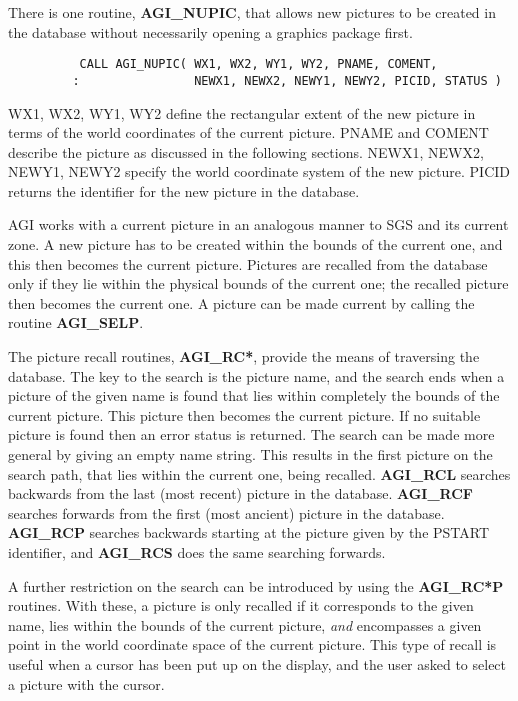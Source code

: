 There is one routine, {\bf AGI\_NUPIC}, that allows new pictures to be created
in the database without necessarily opening a graphics package first.
\begin{verbatim}
          CALL AGI_NUPIC( WX1, WX2, WY1, WY2, PNAME, COMENT,
         :                NEWX1, NEWX2, NEWY1, NEWY2, PICID, STATUS )
\end{verbatim}
WX1, WX2, WY1, WY2 define the rectangular extent of the new picture in terms of
the world coordinates of the current picture.
PNAME and COMENT describe the picture as discussed in the following
sections.
NEWX1, NEWX2, NEWY1, NEWY2 specify the world coordinate system of the new
picture.
PICID returns the identifier for the new picture in the database.

AGI works with a current picture in an analogous manner to SGS and its
current zone.
A new picture has to be created within the bounds of the current one, and this
then becomes the current picture.
Pictures are recalled from the database only if they lie within the physical
bounds of the current one; the recalled picture then becomes the current one.
A picture can be made current by calling the routine {\bf AGI\_SELP}.

The picture recall routines, {\bf AGI\_RC*}, provide the means of traversing
the database.
The key to the search is the picture name, and the search ends when a picture
of the given name is found that lies within completely the bounds of the
current picture. This picture then becomes the current picture.
If no suitable picture is found then an error status is returned.
The search can be made more general by giving an empty name string. This
results in the first picture on the search path, that lies within the current
one, being recalled.
{\bf AGI\_RCL} searches backwards from the last (most recent) picture in the
database.
{\bf AGI\_RCF} searches forwards from the first (most ancient) picture in the
database.
{\bf AGI\_RCP} searches backwards starting at the picture given by the PSTART
identifier, and {\bf AGI\_RCS} does the same searching forwards.

A further restriction on the search can be introduced by using the
{\bf AGI\_RC*P} routines.
With these, a picture is only recalled if it corresponds to the given name,
lies within the bounds of the current picture, {\em and} encompasses a given
point in the world coordinate space of the current picture.
This type of recall is useful when a cursor has been put up on the display,
and the user asked to select a picture with the cursor.

